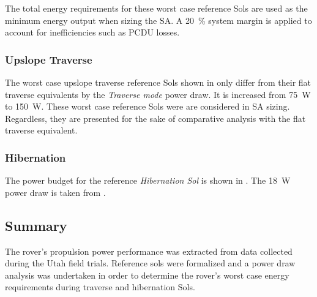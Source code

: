 

The total energy requirements for these worst case reference Sols are used as the minimum energy output when sizing the \ac{SA}. A \SI{20}{\percent} system margin is applied to account for inefficiencies such as \ac{PCDU} losses.

\subsubsection{Upslope Traverse}
\label{sec:Design:PowerBudget:TraversePowerBudget:UpslopeTraverse}
The worst case upslope traverse reference Sols shown in  only differ from their flat traverse equivalents by the \textit{Traverse mode} power draw. It is increased from \SI{75}{\watt} to \SI{150}{\watt}. These worst case reference Sols were are considered in \ac{SA} sizing. Regardless, they are presented for the sake of comparative analysis with the flat traverse equivalent.





\subsubsection{Hibernation}
\label{sec:Design:PowerBudget:TraversePowerBudget:Hibernation}
The power budget for the reference \textit{Hibernation Sol} is shown in . The \SI{18}{\watt} power draw is taken from .



\subsection{Summary}
\label{sec:PowerBudget:Summary}
The rover's propulsion power performance was extracted from data collected during the Utah field trials. Reference sols were formalized and a power draw analysis was undertaken in order to determine the rover's worst case energy requirements during traverse and hibernation Sols.
